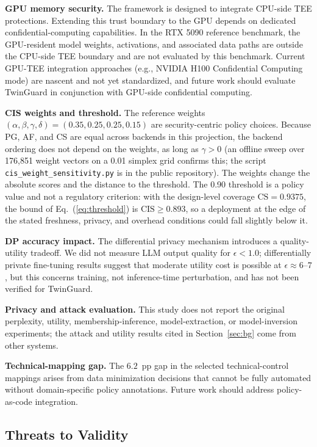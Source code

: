 \documentclass{ieeeaccess}
\begin{document}
\textbf{GPU memory security.} The framework is designed to integrate CPU-side TEE protections. Extending this trust boundary to the GPU depends on
dedicated confidential-computing capabilities. In the RTX 5090 reference benchmark, the GPU-resident model weights, activations, and associated data paths
are outside the CPU-side TEE boundary and are not evaluated by this benchmark.
Current GPU-TEE integration
approaches (e.g., NVIDIA H100 Confidential Computing mode) are nascent and not
yet standardized, and future work should evaluate TwinGuard in conjunction with
GPU-side confidential computing.

\textbf{CIS weights and threshold.} The reference weights
$(\alpha,\beta,\gamma,\delta)=(0.35,0.25,0.25,0.15)$ are security-centric policy choices. Because PG, AF, and CS are equal across backends in this
projection, the backend ordering does not depend on the weights, as long as
$\gamma>0$ (an offline sweep over 176{,}851 weight vectors on a 0.01 simplex
grid confirms this; the script \texttt{cis\_weight\_sensitivity.py} is in the public repository). The weights change the absolute scores and the distance to the threshold. The 0.90 threshold is a
policy value and not a regulatory criterion: with the design-level coverage
$\mathrm{CS}=0.9375$, the bound of Eq.~(\ref{eq:threshold}) is
$\mathrm{CIS}\ge 0.893$, so a deployment at the edge of the stated
freshness, privacy, and overhead conditions could fall slightly below it.

\textbf{DP accuracy impact.} The differential privacy mechanism introduces
a quality-utility tradeoff. We did not measure LLM output quality for
$\epsilon < 1.0$; differentially private
fine-tuning results \cite{yu2022differentially} suggest that moderate utility
cost is possible at $\epsilon \approx 6$--$7$, but this concerns training,
not inference-time perturbation, and has not been verified for TwinGuard.

\textbf{Privacy and attack evaluation.} This study does not report the original perplexity, utility, membership-inference, model-extraction, or model-inversion
experiments; the attack and utility results cited in Section~\ref{sec:bg}
come from other systems.

\textbf{Technical-mapping gap.} The $6.2$~pp gap in the selected
technical-control mappings arises from data minimization decisions that cannot be fully
automated without domain-specific policy annotations. Future work should
address policy-as-code integration.

\subsection{Threats to Validity}
\end{document}
